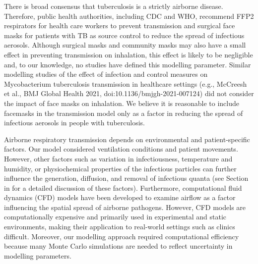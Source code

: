 \documentclass[fleqn,11pt]{wlscirep}
\begin{document}
There is broad consensus that tuberculosis is a strictly airborne disease. Therefore, public health authorities, including CDC and WHO, recommend FFP2 respirators for health care workers to prevent transmission and surgical face masks for patients with TB as source control to reduce the spread of infectious aerosols. Although surgical masks and community masks may also have a small effect in preventing transmission on inhalation, this effect is likely to be negligible and, to our knowledge, no studies have defined this modelling parameter. Similar modelling studies of the effect of infection and control measures on Mycobacterium tuberculosis transmission in healthcare settings (e.g., McCreesh et al., BMJ Global Health 2021, doi:10.1136/bmjgh-2021-007124) did not consider the impact of face masks on inhalation. We believe it is reasonable to include facemasks in the transmission model only as a factor in reducing the spread of infectious aerosols in people with tuberculosis.


Airborne respiratory transmission depends on environmental and patient-specific factors. Our model considered ventilation conditions and patient movements. However, other factors such as variation in infectiousness, temperature and humidity, or physiochemical properties of the infectious particles can further influence the generation, diffusion, and removal of infectious quanta (see Section~ in \supp for a detailed discussion of these factors). Furthermore, computational fluid dynamics (CFD) models have been developed to examine airflow as a factor influencing the spatial spread of airborne pathogens\cite{Vuorinen2020SafSci,Jung2021InfectChemo,Li2021BuildEnv,Yan2023BE,Qian2009BE,Li2022SOTTE}. However, CFD models are computationally expensive and primarily used in experimental and static environments, making their application to real-world settings such as clinics difficult. Moreover, our modelling approach required computational efficiency because many Monte Carlo simulations are needed to reflect uncertainty in modelling parameters. 
\end{document}

